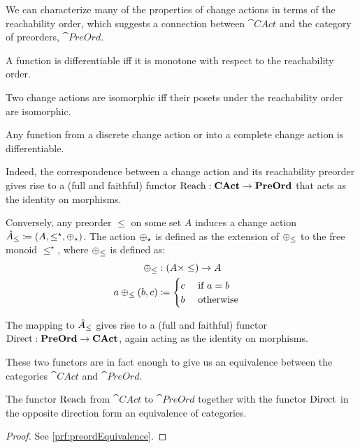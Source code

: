 We can characterize many of the properties of change actions in terms of the reachability order,
which suggests a connection between $\cat{CAct}$ and the category of preorders, $\cat{PreOrd}$.

\begin{prop}
  A function is differentiable iff it is monotone with respect to the
  reachability order. 
\end{prop}

\begin{corollary}
  Two change actions are isomorphic iff their posets under the reachability
  order are isomorphic.
\end{corollary}

\begin{corollary}
  Any function from a discrete change action or into a complete change
  action is differentiable.
\end{corollary}

Indeed, the correspondence between a change action and its reachability preorder gives rise to
a (full and faithful) functor $\operatorname{Reach} : \mathbf{CAct} \rightarrow \mathbf{PreOrd}$ that acts as the
identity on morphisms.

Conversely, any preorder $\leq$ on some set $A$ induces a change action
$\hat{A}_\leq \coloneqq (A,\leq^\star,\oplus_\star)$.
The action $\oplus_\star$ is defined as the extension of $\oplus_\leq$ to the free
monoid $\leq^\star$, where $\oplus_\leq$ is defined as:
\[
\begin{aligned}
   \oplus_\leq &: (A \times \leq) \rightarrow A&\\
   a \oplus_\leq (b, c) &\coloneqq
     \begin{cases}
     c&\text{ if $a = b$}\\
     b&\text{ otherwise}
     \end{cases}
\end{aligned}
\]

The mapping to $\hat{A}_\leq$ gives rise to a (full and faithful) functor
$\operatorname{Direct} : \mathbf{PreOrd} \rightarrow \mathbf{CAct}$, again acting as the identity on morphisms.

These two functors are in fact enough to give us an equivalence between the categories
$\cat{CAct}$ and $\cat{PreOrd}$.

\begin{thm}[name=Equivalence of $\cat{CAct}$ and $\cat{PreOrd}$, restate=preordEquivalence]
  \label{thm:preordEquivalence}
  The functor $\operatorname{Reach}$ from $\cat{CAct}$ to $\cat{PreOrd}$ together with the
  functor $\operatorname{Direct}$ in the opposite direction form an equivalence of categories.
\end{thm}
\ifproofs
\begin{proof}
  See \cref{prf:preordEquivalence}.
\end{proof}
\fi

